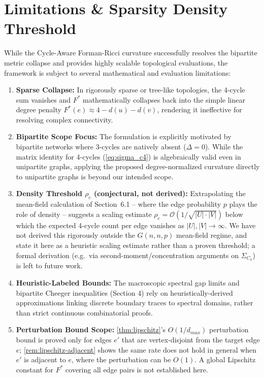 \documentclass{siuro250211}
\theoremstyle{remark}
\theoremstyle{plain}
\begin{document}
\section{Limitations \& Sparsity Density Threshold}
While the Cycle-Aware Forman-Ricci curvature successfully resolves the bipartite metric collapse and provides highly scalable topological evaluations, the framework is subject to several mathematical and evaluation limitations:
\begin{enumerate}
    \item \textbf{Sparse Collapse:} In rigorously sparse or tree-like topologies, the 4-cycle sum vanishes and $F^*$ mathematically collapses back into the simple linear degree penalty $F^*(e) \approx 4 - d(u) - d(v)$, rendering it ineffective for resolving complex connectivity.
    \item \textbf{Bipartite Scope Focus:} The formulation is explicitly motivated by bipartite networks where 3-cycles are natively absent ($\Delta=0$). While the matrix identity for 4-cycles (\cref{eq:sigma_c4}) is algebraically valid even in unipartite graphs, applying the proposed degree-normalized curvature directly to unipartite graphs is beyond our intended scope.
    \item \textbf{Density Threshold $\rho_c$ (conjectural, not derived):} Extrapolating the mean-field calculation of Section~6.1 -- where the edge probability $p$ plays the role of density -- suggests a scaling estimate $\rho_c = \mathcal{O}(1 / \sqrt{|U| \cdot |V|})$ below which the expected 4-cycle count per edge vanishes as $|U|,|V|\to\infty$. We have not derived this rigorously outside the $G(n,n,p)$ mean-field regime, and state it here as a heuristic scaling estimate rather than a proven threshold; a formal derivation (e.g.\ via second-moment/concentration arguments on $\Sigma_{C_4}$) is left to future work.
    \item \textbf{Heuristic-Labeled Bounds:} The macroscopic spectral gap limits and bipartite Cheeger inequalities (Section 4) rely on heuristically-derived approximations linking discrete boundary traces to spectral domains, rather than strict continuous combinatorial proofs.
    \item \textbf{Perturbation Bound Scope:} \cref{thm:lipschitz}'s $O(1/d_{max})$ perturbation bound is proved only for edges $e'$ that are vertex-disjoint from the target edge $e$; \cref{rem:lipschitz-adjacent} shows the same rate does not hold in general when $e'$ is adjacent to $e$, where the perturbation can be $O(1)$. A global Lipschitz constant for $F^*$ covering all edge pairs is not established here.

\end{enumerate}
\end{document}
